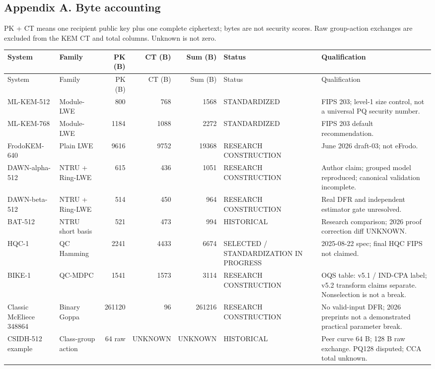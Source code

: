 \documentclass[
  10pt,
  a4paper,
]{article}
\begin{document}
\begin{landscape}
\section{Appendix A. Byte accounting}
\small PK + CT means one recipient public key plus one complete ciphertext; bytes are not security scores. Raw group-action exchanges are excluded from the KEM CT and total columns. Unknown is not zero.\\[8pt]
\small\setlength{\tabcolsep}{4pt}\renewcommand{\arraystretch}{1.25}
\begin{longtable}{p{2.7cm}p{2.2cm}r r r p{3.7cm}p{7cm}}
\toprule System & Family & PK (B) & CT (B) & Sum (B) & Status & Qualification \\ \midrule
\endfirsthead
\toprule System & Family & PK (B) & CT (B) & Sum (B) & Status & Qualification \\ \midrule
\endhead
ML-KEM-512 & Module-LWE & 800 & 768 & 1568 & STANDARDIZED & FIPS 203; level-1 size control, not a universal PQ security number. \\
ML-KEM-768 & Module-LWE & 1184 & 1088 & 2272 & STANDARDIZED & FIPS 203 default recommendation. \\
FrodoKEM-640 & Plain LWE & 9616 & 9752 & 19368 & RESEARCH CONSTRUCTION & June 2026 draft-03; not eFrodo. \\
DAWN-alpha-512 & NTRU + Ring-LWE & 615 & 436 & 1051 & RESEARCH CONSTRUCTION & Author claim; grouped model reproduced; canonical validation incomplete. \\
DAWN-beta-512 & NTRU + Ring-LWE & 514 & 450 & 964 & RESEARCH CONSTRUCTION & Real DFR and independent estimator gate unresolved. \\
BAT-512 & NTRU short basis & 521 & 473 & 994 & HISTORICAL & Research comparison; 2026 proof correction diff UNKNOWN. \\
HQC-1 & QC Hamming & 2241 & 4433 & 6674 & SELECTED / STANDARDIZATION IN PROGRESS & 2025-08-22 spec; final HQC FIPS not claimed. \\
BIKE-1 & QC-MDPC & 1541 & 1573 & 3114 & RESEARCH CONSTRUCTION & OQS table: v5.1 / IND-CPA label; v5.2 transform claims separate. Nonselection is not a break. \\
Classic McEliece 348864 & Binary Goppa & 261120 & 96 & 261216 & RESEARCH CONSTRUCTION & No valid-input DFR; 2026 preprints not a demonstrated practical parameter break. \\
CSIDH-512 example & Class-group action & 64 raw & UNKNOWN & UNKNOWN & HISTORICAL & Peer curve 64 B; 128 B raw exchange. PQ128 disputed; CCA total unknown. \\

\end{longtable}
\end{landscape}
\end{document}
